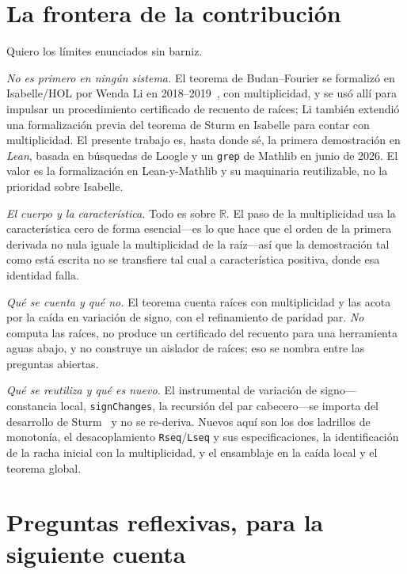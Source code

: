 \documentclass[11pt]{article}
\newcommand{\lean}[1]{\texttt{#1}}
\newcommand{\R}{\mathbb{R}}
\begin{document}
\section{La frontera de la contribuci\'on}\label{sec:boundary}

Quiero los l\'imites enunciados sin barniz.

\emph{No es primero en ning\'un sistema.} El teorema de Budan--Fourier se formaliz\'o en Isabelle/HOL
por Wenda Li en 2018--2019~\cite{liBF}, con multiplicidad, y se us\'o all\'i para impulsar un
procedimiento certificado de recuento de ra\'ices; Li tambi\'en extendi\'o una formalizaci\'on previa
del teorema de Sturm en Isabelle para contar con multiplicidad. El presente trabajo es, hasta donde s\'e,
la primera demostraci\'on en \emph{Lean}, basada en b\'usquedas de Loogle y un \lean{grep} de Mathlib en
junio de 2026. El valor es la formalizaci\'on en Lean-y-Mathlib y su maquinaria reutilizable, no la
prioridad sobre Isabelle.

\emph{El cuerpo y la caracter\'istica.} Todo es sobre $\R$. El paso de la multiplicidad usa la
caracter\'istica cero de forma esencial---es lo que hace que el orden de la primera derivada no nula
iguale la multiplicidad de la ra\'iz---as\'i que la demostraci\'on tal como est\'a escrita no se
transfiere tal cual a caracter\'istica positiva, donde esa identidad falla.

\emph{Qu\'e se cuenta y qu\'e no.} El teorema cuenta ra\'ices con multiplicidad y las acota por la
ca\'ida en variaci\'on de signo, con el refinamiento de paridad par. \emph{No} computa las ra\'ices, no
produce un certificado del recuento para una herramienta aguas abajo, y no construye un aislador de
ra\'ices; eso se nombra entre las preguntas abiertas.

\emph{Qu\'e se reutiliza y qu\'e es nuevo.} El instrumental de variaci\'on de signo---constancia local,
\lean{signChanges}, la recursi\'on del par cabecero---se importa del desarrollo de Sturm~\cite{sturmlean}
y no se re-deriva. Nuevos aqu\'i son los dos ladrillos de monoton\'ia, el desacoplamiento
\lean{Rseq}/\lean{Lseq} y sus especificaciones, la identificaci\'on de la racha inicial con la
multiplicidad, y el ensamblaje en la ca\'ida local y el teorema global.

\section{Preguntas reflexivas, para la siguiente cuenta}\label{sec:questions}
\end{document}
